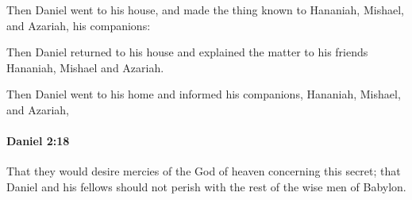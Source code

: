 			\begin{versebox}
					\item[BHS] 
					\item[LXX] 
					\item[ASV] Then Daniel went to his house, and made the thing known to Hananiah, Mishael, and Azariah, his companions:
					\item[NIV] Then Daniel returned to his house and explained the matter to his friends Hananiah, Mishael and Azariah.
					\item[NRSV] Then Daniel went to his home and informed his companions, Hananiah, Mishael, and Azariah,
			\end{versebox}

		\paragraph{Daniel 2:18} %
			\label{DANIEL-2-18}

			That they would desire mercies of the God of heaven concerning this secret; that Daniel and his fellows should not perish with the rest of the wise men of Babylon.

